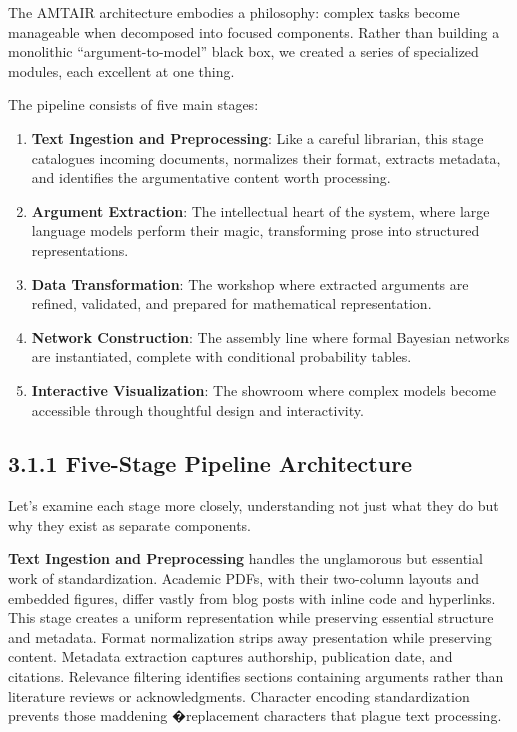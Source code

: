 \documentclass[
  11pt,
  letterpaper,
]{book}
\providecommand{\tightlist}{%
  \setlength{\itemsep}{0pt}\setlength{\parskip}{0pt}}
\begin{document}
The AMTAIR architecture embodies a philosophy: complex tasks become
manageable when decomposed into focused components. Rather than building
a monolithic ``argument-to-model'' black box, we created a series of
specialized modules, each excellent at one thing.

The pipeline consists of five main stages:

\begin{enumerate}
\def\labelenumi{\arabic{enumi}.}
\tightlist
\item
  \textbf{Text Ingestion and Preprocessing}: Like a careful librarian,
  this stage catalogues incoming documents, normalizes their format,
  extracts metadata, and identifies the argumentative content worth
  processing.
\item
  \textbf{Argument Extraction}: The intellectual heart of the system,
  where large language models perform their magic, transforming prose
  into structured representations.
\item
  \textbf{Data Transformation}: The workshop where extracted arguments
  are refined, validated, and prepared for mathematical representation.
\item
  \textbf{Network Construction}: The assembly line where formal Bayesian
  networks are instantiated, complete with conditional probability
  tables.
\item
  \textbf{Interactive Visualization}: The showroom where complex models
  become accessible through thoughtful design and interactivity.
\end{enumerate}

\subsection{3.1.1 Five-Stage Pipeline
Architecture}\label{sec-five-stage-pipeline}

Let's examine each stage more closely, understanding not just what they
do but why they exist as separate components.

\textbf{Text Ingestion and Preprocessing} handles the unglamorous but
essential work of standardization. Academic PDFs, with their two-column
layouts and embedded figures, differ vastly from blog posts with inline
code and hyperlinks. This stage creates a uniform representation while
preserving essential structure and metadata. Format normalization strips
away presentation while preserving content. Metadata extraction captures
authorship, publication date, and citations. Relevance filtering
identifies sections containing arguments rather than literature reviews
or acknowledgments. Character encoding standardization prevents those
maddening �replacement characters that plague text processing.
\end{document}
